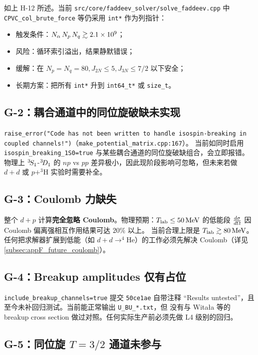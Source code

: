 如上 H-12 所述。当前 \texttt{src/core/faddeev\_solver/solve\_faddeev.cpp} 中 \texttt{CPVC\_col\_brute\_force} 等仍采用 \texttt{int*} 作为列指针：
\begin{itemize}
  \item 触发条件：\(N_\alpha\,N_p\,N_q\gtrsim 2.1\times 10^9\)；
  \item 风险：循环索引溢出，结果静默错误；
  \item 缓解：在 \(N_p=N_q=80,J_{2N}\le 5,J_{3N}\le 7/2\) 以下安全；
  \item 长期方案：把所有 \texttt{int*} 升到 \texttt{int64\_t*} 或 \texttt{size\_t}。
\end{itemize}

\subsection{G-2：耦合通道中的同位旋破缺未实现}

\texttt{raise\_error("Code has not been written to handle isospin-breaking in coupled channels!")}（\texttt{make\_potential\_matrix.cpp:167}）。
当前如同时启用 \texttt{isospin\_breaking\_1S0=true} 与某些耦合通道的同位旋破缺组合，会立即报错。物理上 \({}^{3}\!S_{1}\)-\({}^{3}\!D_{1}\) 的
\(np\) vs \(pp\) 差异极小，因此现阶段影响可忽略，但未来若做 \(d+d\) 或 \(p+^3\!\mathrm{H}\) 实验时需要补全。

\subsection{G-3：Coulomb 力缺失}

整个 \(d+p\) 计算\textbf{完全忽略 Coulomb}。物理预期：\({T_{\text{lab}}}\le 50\,\mathrm{MeV}\) 的低能段 \(\frac{d\sigma}{d\Omega}\) 因 Coulomb 偏离强相互作用结果可达 \(20\%\) 以上。
当前合理上限是 \({T_{\text{lab}}}\gtrsim 80\,\mathrm{MeV}\)。任何把求解器扩展到低能（如 \(d+d\to ^4\!\mathrm{He}\)）的工作必须先解决 Coulomb（详见 \cref{subsec:appF_future_coulomb}）。

\subsection{G-4：Breakup amplitudes 仅有占位}

\texttt{include\_breakup\_channels=true} 提交 \texttt{50ce1ae} 自带注释 “Results untested”，且至今未补回归测试。当前能正常输出 \texttt{U\_BU\_*.txt}，但
没有与 Witała 等的 breakup cross section 做过对照。任何实际生产前必须先做 L4 级别的回归。

\subsection{G-5：同位旋 \(T=3/2\) 通道未参与}

